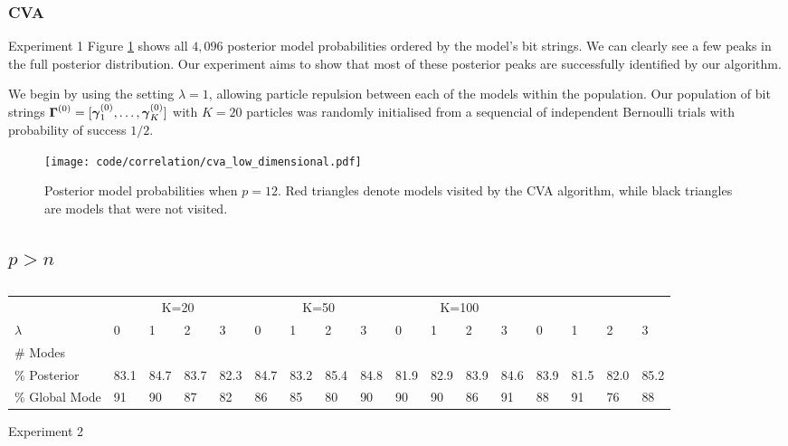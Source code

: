 \documentclass{amsart}[12pt]
\begin{document}
\subsubsection{CVA}

Experiment 1
Figure \ref{fig:result1} shows all $4,096$ posterior model probabilities ordered by the model's bit
strings. We can clearly see a few peaks in the full posterior distribution. Our experiment aims to show that
most of these posterior peaks are successfully identified by our algorithm.

We begin by using the setting $\lambda = 1$, allowing particle repulsion between each of the models within the
population. Our population of bit strings ${\boldsymbol \Gamma}^{(0)} = [{\boldsymbol \gamma}_1^{(0)}, \ldots, {\boldsymbol \gamma}_K^{(0)}]$ with
$K = 20$ particles was randomly initialised from a sequencial of independent Bernoulli trials with probability
of success $1/2$.

\begin{figure}	
	\caption{Posterior model probabilities when $p = 12$. Red triangles denote models visited by the CVA
						algorithm, while black triangles are models that were not visited.}
	\label{fig:result1}
	\texttt{[image: code/correlation/cva\_low\_dimensional.pdf]}
\end{figure}

\subsection{$p > n$}

\begin{table}
	\caption{}
	\label{tab:result2}
	\begin{tabular}{l|llll|llll|llll|llll}
	\hline
	 					& \multicolumn{4}{c}{K=20} 	& \multicolumn{4}{c}{K=50} & \multicolumn{4}{c}{K=100} \\
	$\lambda$ & 0 & 1 & 2 & 3 & 0 & 1 & 2 & 3 & 0 & 1 & 2 & 3 & 0 & 1 & 2 & 3 \\
	\hline
	\# Modes & \\
	\% Posterior & 83.1 & 84.7 & 83.7 & 82.3 & 84.7 & 83.2 & 85.4 & 84.8 & 81.9 & 82.9 & 83.9 & 84.6 & 83.9 & 81.5 & 82.0 & 85.2 \\
	\% Global Mode & 91 & 90 & 87 & 82 & 86 & 85 & 80 & 90 & 90 & 90 & 86 & 91 & 88 & 91 & 76 & 88 \\
	\hline
	\end{tabular}

\end{table}

Experiment 2
\end{document}
